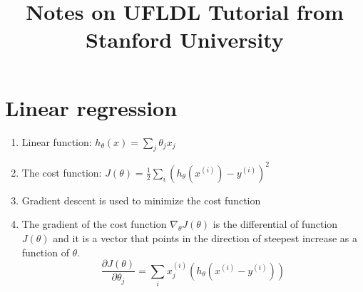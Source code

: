 \documentclass[12pt]{article}
\begin{document}
\title{Notes on UFLDL Tutorial from Stanford University}
\maketitle

\section{Linear regression}
\begin{enumerate}
 \item Linear function: $h_\theta (x) = \sum_j {\theta_j x_j} $
 \item The cost function: $J(\theta) = \frac{1}{2} \sum_i{(h_\theta (x^{(i)}) - y^{(i)})^2}$
 \item Gradient descent is used to minimize the cost function
 \item The gradient of the cost function $\nabla_\theta J(\theta)$ is the differential of function $J(\theta)$ and it is a vector that points in the direction of steepest increase as a function of $\theta$.$$\frac{\partial J(\theta)}{\partial \theta_j} = \sum_i {x_j^{(i)} (h_\theta (x^{(i)} - y^{(i)}))}$$ 
\end{enumerate}
\end{document}
